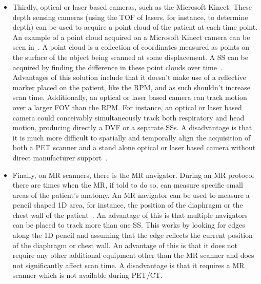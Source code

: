\begin{itemize}
                    \item Thirdly, optical or laser based cameras, such as the Microsoft Kinect. These depth sensing cameras (using the \gls{TOF} of lasers, for instance, to determine depth) can be used to acquire a point cloud of the patient at each time point. An example of a point cloud acquired on a Microsoft Kinect camera can be seen in~. A point cloud is a collection of coordinates measured as points on the surface of the object being scanned at some displacement. A \gls{SS} can be acquired by finding the difference in these point clouds over time~\parencite{Miranda2017MarkerlessAnimals}. Advantages of this solution include that it doesn't make use of a reflective marker placed on the patient, like the \gls{RPM}, and as such shouldn't increase scan time. Additionally, an optical or laser based camera can track motion over a larger \gls{FOV} than the \gls{RPM}. For instance, an optical or laser based camera could conceivably simultaneously track both respiratory and head motion, producing directly a \gls{DVF} or a separate \glspl{SS}. A disadvantage is that it is much more difficult to spatially and temporally align the acquisition of both a \gls{PET} scanner and a stand alone optical or laser based camera without direct manufacturer support~\parencite{Noonan2012AccurateKinect, Noonan2015RepurposingPET, Whitehead2018MotionPET/CT}.
                    
                    \item Finally, on \gls{MR} scanners, there is the \gls{MR} navigator. During an \gls{MR} protocol there are times when the \gls{MR}, if told to do so, can measure specific small areas of the patient's anatomy. An \gls{MR} navigator can be used to measure a pencil shaped \gls{1D} area, for instance, the position of the diaphragm or the chest wall of the patient~\parencite{Taylor1997MRAngiography}. An advantage of this is that multiple navigators can be placed to track more than one \gls{SS}. This works by looking for edges along the \gls{1D} pencil and assuming that the edge reflects the current position of the diaphragm or chest wall. An advantage of this is that it does not require any other additional equipment other than the \gls{MR} scanner and does not significantly affect scan time. A disadvantage is that it requires a \gls{MR} scanner which is not available during \gls{PET}/\gls{CT}.
                \end{itemize}
                
